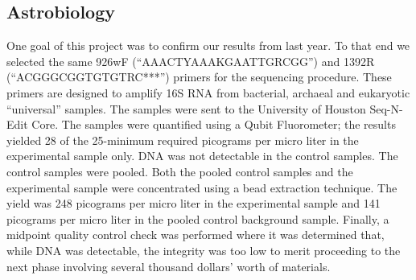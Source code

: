 \subsection{Astrobiology}
\label{sec:Astrobiology-Results}

One goal of this project was to confirm our results from last year. To that end we selected the same 926wF (“AAACTYAAAKGAATTGRCGG”) and 1392R (“ACGGGCGGTGTGTRC***”) primers for the sequencing procedure. These primers are designed to amplify 16S RNA from bacterial, archaeal and eukaryotic “universal” samples. The samples were sent to the University of Houston Seq-N-Edit Core. The samples were quantified using a Qubit Fluorometer; the results yielded 28 of the 25-minimum required picograms per micro liter in the experimental sample only. DNA was not detectable in the control samples. The control samples were pooled. Both the pooled control samples and the experimental sample were concentrated using a bead extraction technique. The yield was 248 picograms per micro liter in the experimental sample and 141 picograms per micro liter in the pooled control background sample. Finally, a midpoint quality control check was  performed where it was determined that, while DNA was detectable, the integrity was too low to merit proceeding to the next phase involving several thousand dollars’ worth of materials. 